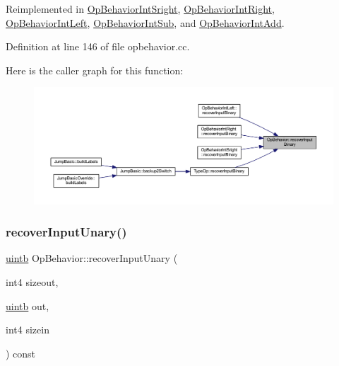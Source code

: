 Reimplemented in \mbox{\hyperlink{class_op_behavior_int_sright_ac22c09d6564cc3d35b8658ae57d10e43}{Op\+Behavior\+Int\+Sright}}, \mbox{\hyperlink{class_op_behavior_int_right_a8ee48eb765dc6c9427c0f10aceee4fe8}{Op\+Behavior\+Int\+Right}}, \mbox{\hyperlink{class_op_behavior_int_left_a3f4a8ac6409197c7c89cec1ef448bbd8}{Op\+Behavior\+Int\+Left}}, \mbox{\hyperlink{class_op_behavior_int_sub_a1647fd9949497b49b5c152ae36710b3a}{Op\+Behavior\+Int\+Sub}}, and \mbox{\hyperlink{class_op_behavior_int_add_acc0fa0fbf78a06922183b127b1be4b1e}{Op\+Behavior\+Int\+Add}}.



Definition at line 146 of file opbehavior.\+cc.

Here is the caller graph for this function\+:
\nopagebreak
\begin{figure}[H]
\begin{center}
\leavevmode
\includegraphics[width=350pt]{class_op_behavior_adebec9b6516f4efa5c65323abd3619c3_icgraph}
\end{center}
\end{figure}
\mbox{\label{class_op_behavior_a6c3b008e093085e50f71020437be3b03}} 
\subsubsection{\texorpdfstring{recoverInputUnary()}{recoverInputUnary()}}
{\footnotesize\ttfamily \mbox{\hyperlink{types_8h_a2db313c5d32a12b01d26ac9b3bca178f}{uintb}} Op\+Behavior\+::recover\+Input\+Unary (\begin{DoxyParamCaption}\item[{int4}]{sizeout,  }\item[{\mbox{\hyperlink{types_8h_a2db313c5d32a12b01d26ac9b3bca178f}{uintb}}}]{out,  }\item[{int4}]{sizein }\end{DoxyParamCaption}) const\hspace{0.3cm}{\ttfamily [virtual]}}



